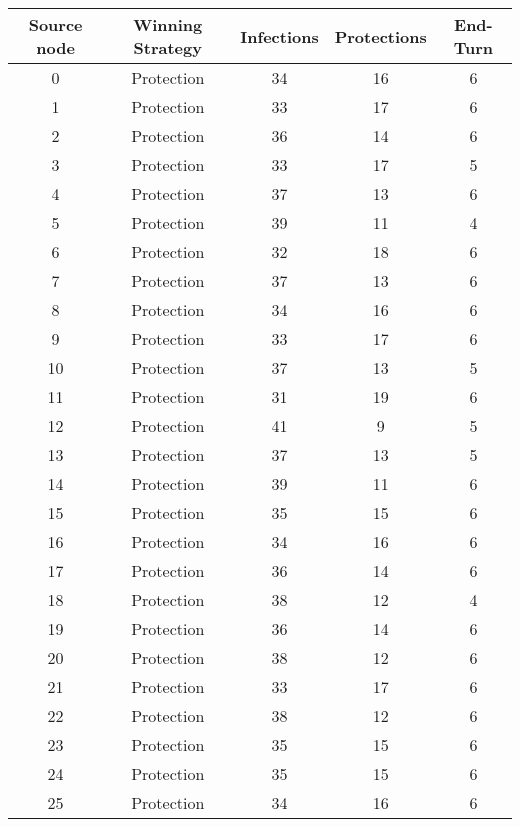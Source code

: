 \documentclass[results.tex]{subfiles}
\begin{document}
\begin{center}
  \begin{tabular}{| c || c | c | c | c |}
    \hline
    {\bfseries Source node} & {\bfseries Winning Strategy} & {\bfseries Infections} & {\bfseries Protections} & {\bfseries End-Turn} \\  %
    \hline\hline
    0 & Protection & 34 & 16 & 6 \\ 
    \hline
    1 & Protection & 33 & 17 & 6 \\ 
    \hline
    2 & Protection & 36 & 14 & 6 \\ 
    \hline
    3 & Protection & 33 & 17 & 5 \\ 
    \hline
    4 & Protection & 37 & 13 & 6 \\ 
    \hline
    5 & Protection & 39 & 11 & 4 \\ 
    \hline
    6 & Protection & 32 & 18 & 6 \\ 
    \hline
    7 & Protection & 37 & 13 & 6 \\ 
    \hline
    8 & Protection & 34 & 16 & 6 \\ 
    \hline
    9 & Protection & 33 & 17 & 6 \\ 
    \hline
    10 & Protection & 37 & 13 & 5 \\ 
    \hline
    11 & Protection & 31 & 19 & 6 \\ 
    \hline
    12 & Protection & 41 & 9 & 5 \\ 
    \hline
    13 & Protection & 37 & 13 & 5 \\ 
    \hline
    14 & Protection & 39 & 11 & 6 \\ 
    \hline
    15 & Protection & 35 & 15 & 6 \\ 
    \hline
    16 & Protection & 34 & 16 & 6 \\ 
    \hline
    17 & Protection & 36 & 14 & 6 \\ 
    \hline
    18 & Protection & 38 & 12 & 4 \\ 
    \hline
    19 & Protection & 36 & 14 & 6 \\ 
    \hline
    20 & Protection & 38 & 12 & 6 \\ 
    \hline
    21 & Protection & 33 & 17 & 6 \\ 
    \hline
    22 & Protection & 38 & 12 & 6 \\ 
    \hline
    23 & Protection & 35 & 15 & 6 \\ 
    \hline
    24 & Protection & 35 & 15 & 6 \\ 
    \hline
    25 & Protection & 34 & 16 & 6 \\ 

\end{tabular}
\end{center}
\end{document}
